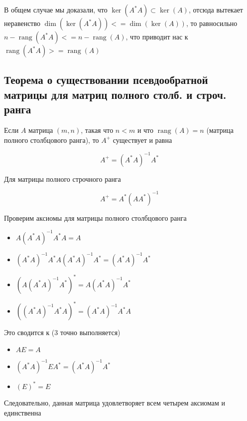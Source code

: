 \documentclass{article}
\begin{document}
    В общем случае мы доказали, что $\ker(A^{*} A) \subset \ker(A) $, отсюда вытекает неравенство
    $\dim(\ker(A^{*} A)) <= \dim(\ker(A))$, то равносильно $n - \operatorname{rang}(A^{*} A) <= n - \operatorname{rang}(A)$, что приводит нас к
    $\operatorname{rang}(A^{*} A) >= \operatorname{rang}(A)$
    
    \quad
    
    \subsection{Теорема о существовании псевдообратной матрицы для матриц полного столб. и строч. ранга}

    Если $A$ матрица $(m, n)$, такая что $n < m$ и что $\operatorname{rang}(A) = n$ (матрица полного столбцового ранга), то $A^{+}$ существует
    и равна

    \begin{equation}
        A^{+} = (A^{*} A)^{-1} A ^{*}
    \end{equation}

    Для матрицы полного строчного ранга

    \begin{equation}
        A^{+} = A^{*} (A A ^{*})^{-1}
    \end{equation}

    Проверим аксиомы для матрицы полного столбцового ранга

    \begin{itemize}
        \item $A (A^{*} A)^{-1} A ^{*} A = A$
        \item $(A^{*} A)^{-1} A ^{*} A (A^{*} A)^{-1} A ^{*} = (A^{*} A)^{-1} A ^{*}$
        \item $(A (A^{*} A)^{-1} A ^{*})^{*} = A (A^{*} A)^{-1} A ^{*}$
        \item $((A^{*} A)^{-1} A ^{*}A)^{*} = (A^{*} A)^{-1} A ^{*}A$
    \end{itemize}

    Это сводится к
    (3 точно выполняется)

    \begin{itemize}
        \item $A E = A$
        \item $(A^{*} A)^{-1} E A ^{*} = (A^{*} A)^{-1} A ^{*}$
        \item $(E)^{*} = E$
    \end{itemize}

    Следовательно, данная матрица удовлетворяет всем четырем аксиомам и единственна
\end{document}
